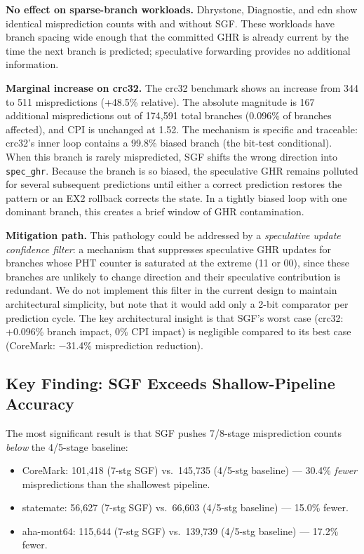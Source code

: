 \documentclass[journal]{IEEEtran}
\begin{document}
\begin{table}[t]
\begin{table}[t]
\begin{table}[t]
\begin{table}[t]
\begin{table}[t]
\begin{table}[t]
\textbf{No effect on sparse-branch workloads.} Dhrystone, Diagnostic, and edn show identical misprediction counts with and without SGF. These workloads have branch spacing wide enough that the committed GHR is already current by the time the next branch is predicted; speculative forwarding provides no additional information.

\textbf{Marginal increase on crc32.} The crc32 benchmark shows an increase from 344 to 511 mispredictions (+48.5\% relative). The absolute magnitude is 167 additional mispredictions out of 174{,}591 total branches (0.096\% of branches affected), and CPI is unchanged at 1.52. The mechanism is specific and traceable: crc32's inner loop contains a 99.8\% biased branch (the bit-test conditional). When this branch is rarely mispredicted, SGF shifts the wrong direction into \texttt{spec\_ghr}. Because the branch is so biased, the speculative GHR remains polluted for several subsequent predictions until either a correct prediction restores the pattern or an EX2 rollback corrects the state. In a tightly biased loop with one dominant branch, this creates a brief window of GHR contamination.

\textbf{Mitigation path.} This pathology could be addressed by a \emph{speculative update confidence filter}: a mechanism that suppresses speculative GHR updates for branches whose PHT counter is saturated at the extreme (11 or 00), since these branches are unlikely to change direction and their speculative contribution is redundant. We do not implement this filter in the current design to maintain architectural simplicity, but note that it would add only a 2-bit comparator per prediction cycle. The key architectural insight is that SGF's worst case (crc32: +0.096\% branch impact, 0\% CPI impact) is negligible compared to its best case (CoreMark: $-$31.4\% misprediction reduction).

\subsection{Key Finding: SGF Exceeds Shallow-Pipeline Accuracy}

The most significant result is that SGF pushes 7/8-stage misprediction counts \emph{below} the 4/5-stage baseline:
\begin{itemize}
\item CoreMark: 101{,}418 (7-stg SGF) vs.\ 145{,}735 (4/5-stg baseline) --- 30.4\% \emph{fewer} mispredictions than the shallowest pipeline.
\item statemate: 56{,}627 (7-stg SGF) vs.\ 66{,}603 (4/5-stg baseline) --- 15.0\% fewer.
\item aha-mont64: 115{,}644 (7-stg SGF) vs.\ 139{,}739 (4/5-stg baseline) --- 17.2\% fewer.
\end{itemize}


\end{table}
\end{table}
\end{table}
\end{table}
\end{table}
\end{table}
\end{document}
